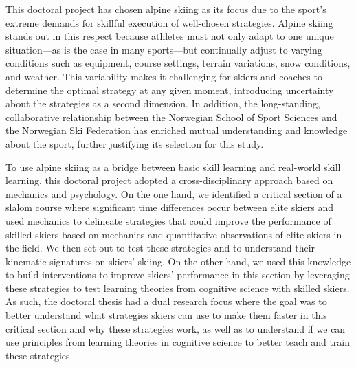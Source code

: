 This doctoral project has chosen alpine skiing as its focus due to the sport's extreme demands for skillful execution of well-chosen strategies. Alpine skiing stands out in this respect because athletes must not only adapt to one unique situation—as is the case in many sports—but continually adjust to varying conditions such as equipment, course settings, terrain variations, snow conditions, and weather. This variability makes it challenging for skiers and coaches to determine the optimal strategy at any given moment, introducing uncertainty about the strategies as a second dimension. In addition, the long-standing, collaborative relationship between the Norwegian School of Sport Sciences and the Norwegian Ski Federation has enriched mutual understanding and knowledge about the sport, further justifying its selection for this study. 

To use alpine skiing as a bridge between basic skill learning and real-world skill learning, this doctoral project adopted a cross-disciplinary approach based on mechanics and psychology. On the one hand, we identified a critical section of a slalom course where significant time differences occur between elite skiers and used mechanics to delineate strategies that could improve the performance of skilled skiers based on mechanics and quantitative observations of elite skiers in the field. We then set out to test these strategies and to understand their kinematic signatures on skiers' skiing. On the other hand, we used this knowledge to build interventions to improve skiers' performance in this section by leveraging these strategies to test learning theories from cognitive science with skilled skiers. As such, the doctoral thesis had a dual research focus where the goal was to better understand what strategies skiers can use to make them faster in this critical section and why these strategies work, as well as to understand if we can use principles from learning theories in cognitive science to better teach and train these strategies.



